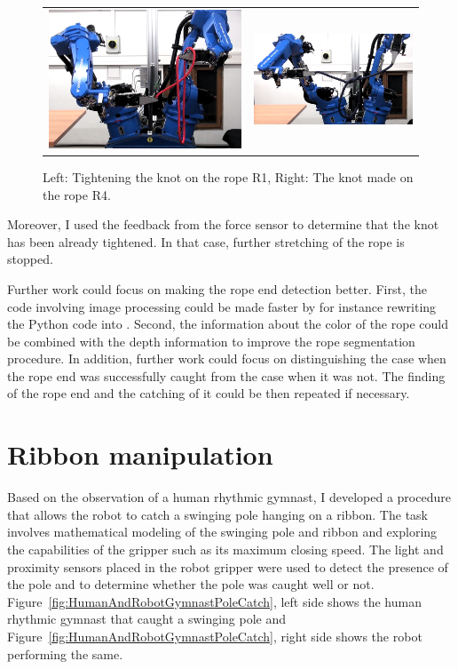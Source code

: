         \begin{figure}[h]
            \centering
            \begin{tabular}{cc}
            \includegraphics[height=0.3\textwidth]{Img/tyer/R1KnotTightening.png}
            &
            \includegraphics[height=0.3\textwidth]{Img/tyer/R4KnotTightening.png}

            \end{tabular}
            \caption{Left: Tightening the knot on the rope R1, Right: The knot made on the rope R4.}
            \label{fig:R1R4ExampleImgs}
        \end{figure}

        Moreover, I used the feedback from the force sensor to determine that the knot has been already tightened. In that case, further stretching of the rope is stopped.

        Further work could focus on making the rope end detection better. First, the code involving image processing could be made faster by for instance rewriting the Python code into \Cplusplus. Second, the information about the color of the rope could be combined with the depth information to improve the rope segmentation procedure. In addition, further work could focus on distinguishing the case when the rope end was successfully caught from the case when it was not. The finding of the rope end and the catching of it could be then repeated if necessary.

    \section{Ribbon manipulation}
        Based on the observation of a human rhythmic gymnast, I developed a procedure that allows the \CloPeMa\/ robot to catch a swinging pole hanging on a ribbon. The task involves mathematical modeling of the swinging pole and ribbon and exploring the capabilities of the gripper such as its maximum closing speed. The light and proximity sensors placed in the robot gripper were used to detect the presence of the pole and to determine whether the pole was caught well or not. Figure~\ref{fig:HumanAndRobotGymnastPoleCatch}, left side shows the human rhythmic gymnast that caught a swinging pole and Figure~\ref{fig:HumanAndRobotGymnastPoleCatch}, right side shows the \CloPeMa\/ robot performing the same.

